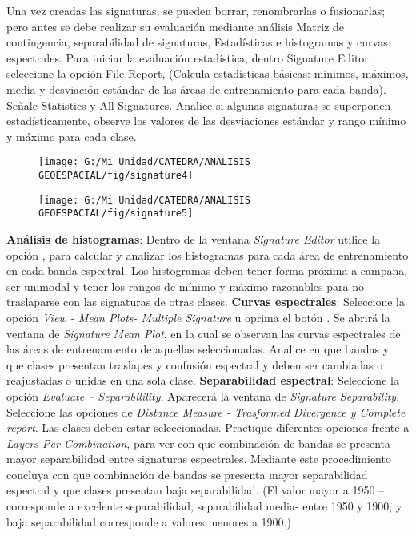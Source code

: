 \documentclass[a4paper,oneside,11pt,]{article}
\begin{document}
Una vez creadas las signaturas, se pueden borrar, renombrarlas o fusionarlas;  pero antes se debe realizar  su  evaluación  mediante  análisis Matriz de contingencia, separabilidad de signaturas, Estadísticas e histogramas y curvas espectrales.
Para iniciar la evaluación estadística, dentro Signature  Editor   seleccione  la   opción   File-Report, (Calcula estadísticas básicas: mínimos, máximos,  media  y  desviación   estándar  de  las áreas de entrenamiento para cada banda). Señale Statistics y All Signatures. Analice  si  algunas signaturas se superponen estadísticamente, observe  los  valores  de  las  desviaciones  estándar  y rango  mínimo y máximo para cada clase.

\begin{figure}
\centering
\texttt{[image: G:/Mi Unidad/CATEDRA/ANALISIS GEOESPACIAL/fig/signature4]}
\end{figure}

\begin{figure}
\centering
\texttt{[image: G:/Mi Unidad/CATEDRA/ANALISIS GEOESPACIAL/fig/signature5]}
\end{figure}

\textbf{Análisis de histogramas}: Dentro de la ventana \emph{Signature Editor} utilice la opción  , para calcular y analizar los histogramas para cada área de entrenamiento en cada banda espectral. Los histogramas deben tener forma próxima a campana, ser unimodal y tener los rangos de mínimo y máximo razonables para no traslaparse con las signaturas de otras clases.
\textbf{Curvas espectrales}: Seleccione la opción \emph{View -  Mean Plots- Multiple Signature} u oprima el botón  . Se abrirá la ventana de \emph{Signature Mean Plot}, en la cual se observan las curvas espectrales de las áreas de entrenamiento de aquellas seleccionadas. Analice en que bandas y que clases presentan traslapes y confusión espectral y deben ser cambiadas o reajustadas o unidas en una sola clase.
\textbf{Separabilidad espectral}: Seleccione la opción \emph{Evaluate – Separabilility}, Aparecerá la ventana de \emph{Signature Separability}. Seleccione las opciones de \emph{Distance Measure  - Trasformed Divergence y Complete report}. Las clases deben estar seleccionadas. Practique diferentes opciones frente a \emph{Layers Per Combination}, para ver con que combinación de bandas se presenta mayor separabilidad entre signaturas espectrales.  Mediante este procedimiento concluya con que combinación de bandas se presenta mayor separabilidad espectral y que clases presentan baja separabilidad. (El valor mayor a 1950 – corresponde a excelente separabilidad, separabilidad media- entre 1950 y 1900; y baja separabilidad corresponde a valores menores a 1900.)
\end{document}
